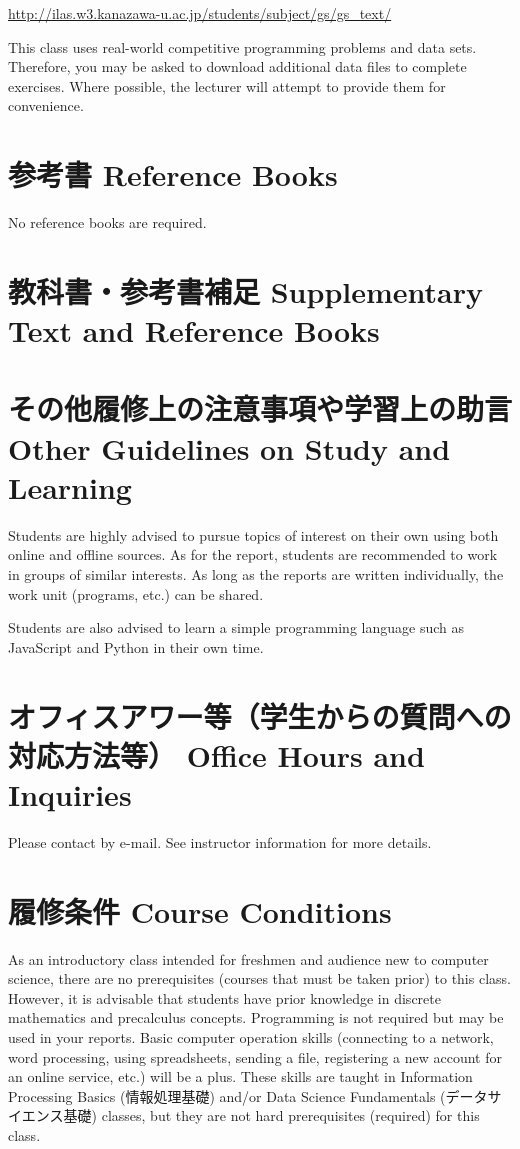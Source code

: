 \documentclass{article}
\begin{document}
\url{http://ilas.w3.kanazawa-u.ac.jp/students/subject/gs/gs_text/}

This class uses real-world competitive programming problems and data sets. Therefore, you may be asked to download additional data files to complete exercises. Where possible, the lecturer will attempt to provide them for convenience.

\section{参考書 Reference Books}
No reference books are required.

\section{教科書・参考書補足 Supplementary Text and Reference Books}

\section{その他履修上の注意事項や学習上の助言 Other Guidelines on Study and Learning}
Students are highly advised to pursue topics of interest on their own using both online and offline sources. As for the report, students are recommended to work in groups of similar interests. As long as the reports are written individually, the work unit (programs, etc.) can be shared.

Students are also advised to learn a simple programming language such as JavaScript and Python in their own time.

\section{オフィスアワー等（学生からの質問への対応方法等） Office Hours and Inquiries}
Please contact by e-mail. See instructor information for more details.

\section{履修条件 Course Conditions}
As an introductory class intended for freshmen and audience new to computer science, there are no prerequisites (courses that must be taken prior) to this class. However, it is advisable that students have prior knowledge in discrete mathematics and precalculus concepts. Programming is not required but may be used in your reports. Basic computer operation skills (connecting to a network, word processing, using spreadsheets, sending a file, registering a new account for an online service, etc.) will be a plus. These skills are taught in Information Processing Basics (情報処理基礎) and/or Data Science Fundamentals (データサイエンス基礎) classes, but they are not hard prerequisites (required) for this class.
\end{document}
